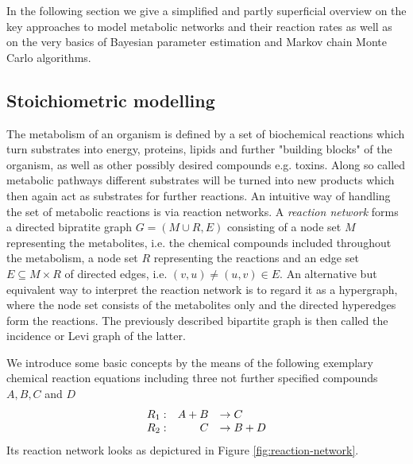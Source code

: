 \documentclass[10pt]{article}
\newcommand{\eg}{e.g.~}
\begin{document}
In the following section we give a simplified and partly superficial overview on the key 
approaches to model metabolic networks and their reaction rates as well as on the very basics of
Bayesian parameter estimation and Markov chain Monte Carlo algorithms.


\subsection{Stoichiometric modelling}
\label{sec:stoichiometric-modelling}

The metabolism of an organism is defined by a set of biochemical reactions which turn substrates into energy, proteins, 
lipids and further "building blocks" of the organism, as well as other possibly desired compounds e.g. toxins.
Along so called metabolic pathways different substrates will be turned into new products which then again act as 
substrates for further reactions.
An intuitive way of handling the set of metabolic reactions is via reaction networks.
A \emph{reaction network} forms a directed bipratite graph $G=(M \cup R,E)$ consisting of a node set $M$ 
representing the metabolites, i.e. the chemical compounds included throughout the metabolism, 
a node set $R$ representing the reactions and an edge set $E \subseteq M \times R$ of directed edges, 
i.e. $(v,u) \neq (u,v) \in E$.
An alternative but equivalent way to interpret the reaction network is to regard it as a hypergraph, 
where the node set consists of the metabolites only and the directed hyperedges form the reactions.
The previously described bipartite graph is then called the incidence or Levi graph of the latter.

We introduce some basic concepts by the means of the following exemplary chemical reaction equations 
including three not further specified compounds $A, B, C$ and $D$
\begin{align}
    \begin{array}{r r l}
	R_1: & A + B & \to C \\
	R_2: & C & \to B + D
    \end{array} \label{eq:reaction-eqs}
\end{align}
Its reaction network looks as depictured in Figure \ref{fig:reaction-network}.
\end{document}
